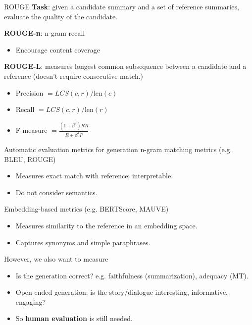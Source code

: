 \documentclass[usenames,dvipsnames,notes,11pt,aspectratio=169,hyperref={colorlinks=true, linkcolor=blue}]{beamer}
\begin{document}
\begin{frame}
    {ROUGE}
    \textbf{Task}: given a candidate summary and a set of reference summaries, evaluate the quality of the candidate.

    \textbf{ROUGE-n}: n-gram recall\\
    \begin{itemize}
        \item Encourage content coverage 
    \end{itemize}

    \textbf{ROUGE-L}: measures longest common subsequence between a candidate and a reference (doesn't require consecutive match.)\\
    \begin{itemize}
        \item Precision $ = LCS(c, r) / \text{len}(c)$
        \item Recall $ = LCS(c, r) / \text{len}(r)$
        \item F-measure $ = \frac{(1+\beta^2)RR}{R + \beta^2 P}$
    \end{itemize}
\end{frame}

\begin{frame}
    {Automatic evaluation metrics for generation}
    n-gram matching metrics (e.g. BLEU, ROUGE)\\
    \begin{itemize}
        \item Measures exact match with reference; interpretable.
        \item Do not consider semantics.
    \end{itemize}

    Embedding-based metrics (e.g. BERTScore, MAUVE)\\
    \begin{itemize}
        \item Measures similarity to the reference in an embedding space.
        \item Captures synonyms and simple paraphrases.
    \end{itemize}

    However, we also want to measure\\
    \begin{itemize}
        \item Is the generation correct? e.g. faithfulness (summarization), adequacy (MT).
        \item Open-ended generation: is the story/dialogue interesting, informative, engaging?
        \item So \textbf{human evaluation} is still needed.
    \end{itemize}
\end{frame}
\end{document}
